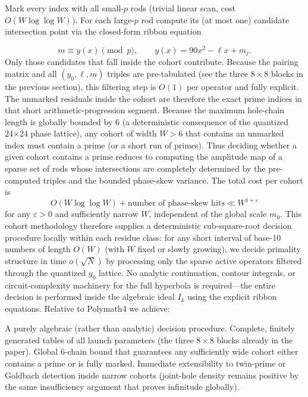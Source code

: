\documentclass[11pt,a4paper]{article}
\begin{document}
Mark every index with all small-$  p  $ rods (trivial linear scan, cost $  O(W\log\log W)  $).
For each large-$  p  $ rod compute its (at most one) candidate intersection point via the closed-form ribbon equation

$$m\equiv y(x)\pmod{p},\qquad y(x)=90x^2-\ell x+m_j.$$
Only those candidates that fall inside the cohort contribute. Because the pairing matrix and all $  (y_0,\ell,m)  $ triples are pre-tabulated (see the three $  8\times8  $ blocks in the previous section), this filtering step is $  O(1)  $ per operator and fully explicit.
The unmarked residuals inside the cohort are therefore the exact prime indices in that short arithmetic-progression segment. Because the maximum hole-chain length is globally bounded by 6 (a deterministic consequence of the quantized 24×24 phase lattice), any cohort of width $  W>6  $ that contains an unmarked index must contain a prime (or a short run of primes). Thus deciding whether a given cohort contains a prime reduces to computing the amplitude map of a sparse set of rods whose intersections are completely determined by the pre-computed triples and the bounded phase-skew variance. The total cost per cohort is
$$O(W\log\log W)+\text{number of phase-skew hits}\ll W^{1+\varepsilon}$$
for any $  \varepsilon>0  $ and sufficiently narrow $  W  $, independent of the global scale $  m_0  $.
This cohort methodology therefore supplies a deterministic sub-square-root decision procedure locally within each residue class: for any short interval of base-10 numbers of length $  O(W)  $ (with $  W  $ fixed or slowly growing), we decide primality structure in time $  o(\sqrt{N})  $ by processing only the sparse active operators filtered through the quantized $  y_0  $ lattice. No analytic continuation, contour integrals, or circuit-complexity machinery for the full hyperbola is required—the entire decision is performed inside the algebraic ideal $  I_k  $ using the explicit ribbon equations.
Relative to Polymath4 we achieve:

A purely algebraic (rather than analytic) decision procedure.
Complete, finitely generated tables of all launch parameters (the three $  8\times8  $ blocks already in the paper).
Global 6-chain bound that guarantees any sufficiently wide cohort either contains a prime or is fully marked.
Immediate extensibility to twin-prime or Goldbach detection inside narrow cohorts (joint-hole density remains positive by the same insufficiency argument that proves infinitude globally).
\end{document}
